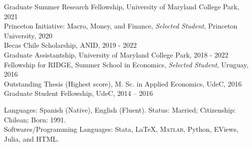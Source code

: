 \documentclass[10pt]{article}
\providecommand\Matlab{\textsc{Matlab}}
\begin{document}
\begin{description}[leftmargin=10em,style=nextline]
  \item[Grants and Awards] Graduate Summer Research Fellowship, University of Maryland College Park, 2021\\
  Princeton Initiative: Macro, Money, and Finance, \emph{Selected Student}, Princeton University, 2020\\
  Becas Chile Scholarship, ANID, 2019 - 2022\\
  Graduate Assistantship, University of Maryland College Park, 2018 - 2022\\
  Fellowship for RIDGE, Summer School in Economics, \emph{Selected Student}, Uruguay, 2016\\
  Outstanding Thesis (Highest score), M. Sc. in Applied Economics, UdeC, 2016\\
  Graduate Student Fellowship, UdeC, 2014 -- 2016\\[-.1in]
  \item[Others] Languages: Spanish (Native), English (Fluent). Status: Married; Citizenship: Chilean; Born: 1991.\\
  Softwares/Programming Languages: Stata, \LaTeX, \Matlab, Python, EViews, Julia, and HTML.\\
  \end{description}



%
%
%


\end{document}
